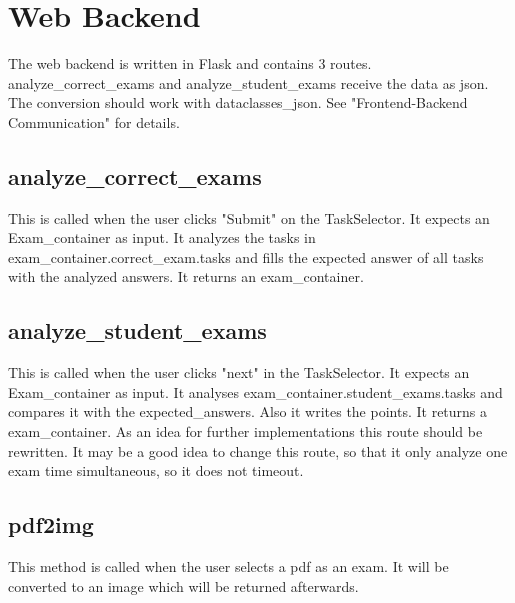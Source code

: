\author{Paul Hoffmann}
\graphicspath{ {./src/chapters/developer/media/} }

\chapter{Web Backend}
The web backend is written in Flask and contains 3 routes.
analyze\_correct\_exams and analyze\_student\_exams receive the data as json.
The conversion should work with dataclasses\_json.
See "Frontend-Backend Communication" for details.

\section{analyze\_correct\_exams}
This is called when the user clicks "Submit" on the TaskSelector.
It expects an Exam\_container as input.
It analyzes the tasks in exam\_container.correct\_exam.tasks and fills the expected answer of all tasks with the analyzed answers.
It returns an exam\_container.

\section{analyze\_student\_exams}
This is called when the user clicks "next" in the TaskSelector.
It expects an Exam\_container as input.
It analyses exam\_container.student\_exams.tasks and compares it with the expected\_answers.
Also it writes the points.
It returns a exam\_container.
As an idea for further implementations this route should be rewritten.
It may be a good idea to change this route, so that it only analyze one exam time simultaneous, so it does not timeout.

\section{pdf2img}
This method is called when the user selects a pdf as an exam.
It will be converted to an image which will be returned afterwards.
